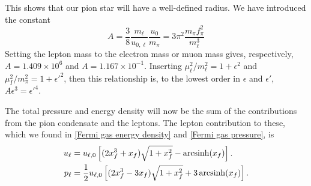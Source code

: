 This shows that our pion star will have a well-defined radius.
We have introduced the constant
%
\begin{equation}
    A = \frac{3}{8} \frac{m_\ell} {u_{0, \ell}} \frac{u_0}{m_\pi}
    = 3\pi^2 \frac{m_\pi f_\pi^2}{m_\ell^3}  
\end{equation}
%
Setting the lepton mass to the electron mass or muon mass gives, respectively, $A = 1.409\times10^{6}$ and $A = 1.167\times 10^{-1}$.
Inserting $\mu_\ell^2/m_\ell^2 = 1 + \epsilon^2$ and $\mu_I^2 / m_\pi^2 = 1 + \epsilon'^2$, then this relationship is, to the lowest order in $\epsilon$ and $\epsilon'$, $A \epsilon^3 = \epsilon'^4$.



The total pressure and energy density will now be the sum of the contributions from the pion condensate and the leptons.
The lepton contribution to these, which we found in \autoref{Fermi gas energy density} and \autoref{Fermi gas pressure}, is
%
\begin{align}
    u_\ell 
    &= u_{\ell,0} 
    \left[
        (2x_f^3 + x_f) \sqrt{1+x_f^2} - \operatorname{arcsinh}(x_f)
    \right]. \\
    p_\ell 
    &=\frac{1}{2} u_{\ell,0} 
    \left[
        (2x_f^3 - 3x_f) \sqrt{1+x_f^2} + 3\operatorname{arcsinh}(x_f)
    \right].
\end{align}
%
